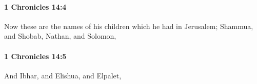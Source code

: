 		\paragraph{1 Chronicles 14:4} %
			\label{1CHRONICLES-14-4}

			Now these are the names of his children which he had in Jerusalem; Shammua, and Shobab, Nathan, and Solomon,


		\paragraph{1 Chronicles 14:5} %
			\label{1CHRONICLES-14-5}

			And Ibhar, and Elishua, and Elpalet,


